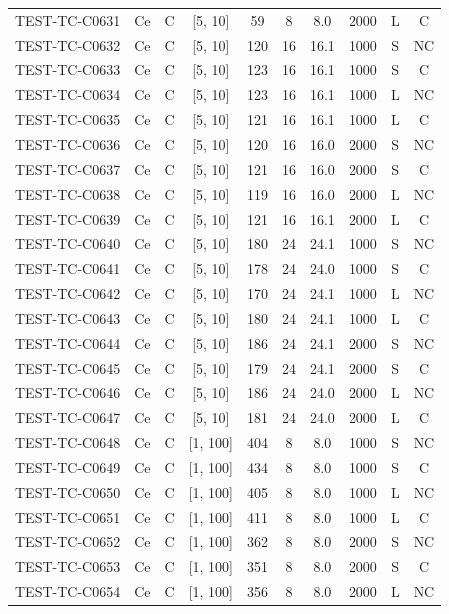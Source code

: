 \begin{longtable}{lccccccccc}
TEST-TC-C0631 & Ce & C & [5, 10] & 59 & 8 & 8.0 & 2000 & L & C \\
TEST-TC-C0632 & Ce & C & [5, 10] & 120 & 16 & 16.1 & 1000 & S & NC \\
TEST-TC-C0633 & Ce & C & [5, 10] & 123 & 16 & 16.1 & 1000 & S & C \\
TEST-TC-C0634 & Ce & C & [5, 10] & 123 & 16 & 16.1 & 1000 & L & NC \\
TEST-TC-C0635 & Ce & C & [5, 10] & 121 & 16 & 16.1 & 1000 & L & C \\
TEST-TC-C0636 & Ce & C & [5, 10] & 120 & 16 & 16.0 & 2000 & S & NC \\
TEST-TC-C0637 & Ce & C & [5, 10] & 121 & 16 & 16.0 & 2000 & S & C \\
TEST-TC-C0638 & Ce & C & [5, 10] & 119 & 16 & 16.0 & 2000 & L & NC \\
TEST-TC-C0639 & Ce & C & [5, 10] & 121 & 16 & 16.1 & 2000 & L & C \\
TEST-TC-C0640 & Ce & C & [5, 10] & 180 & 24 & 24.1 & 1000 & S & NC \\
TEST-TC-C0641 & Ce & C & [5, 10] & 178 & 24 & 24.0 & 1000 & S & C \\
TEST-TC-C0642 & Ce & C & [5, 10] & 170 & 24 & 24.1 & 1000 & L & NC \\
TEST-TC-C0643 & Ce & C & [5, 10] & 180 & 24 & 24.1 & 1000 & L & C \\
TEST-TC-C0644 & Ce & C & [5, 10] & 186 & 24 & 24.1 & 2000 & S & NC \\
TEST-TC-C0645 & Ce & C & [5, 10] & 179 & 24 & 24.1 & 2000 & S & C \\
TEST-TC-C0646 & Ce & C & [5, 10] & 186 & 24 & 24.0 & 2000 & L & NC \\
TEST-TC-C0647 & Ce & C & [5, 10] & 181 & 24 & 24.0 & 2000 & L & C \\
TEST-TC-C0648 & Ce & C & [1, 100] & 404 & 8 & 8.0 & 1000 & S & NC \\
TEST-TC-C0649 & Ce & C & [1, 100] & 434 & 8 & 8.0 & 1000 & S & C \\
TEST-TC-C0650 & Ce & C & [1, 100] & 405 & 8 & 8.0 & 1000 & L & NC \\
TEST-TC-C0651 & Ce & C & [1, 100] & 411 & 8 & 8.0 & 1000 & L & C \\
TEST-TC-C0652 & Ce & C & [1, 100] & 362 & 8 & 8.0 & 2000 & S & NC \\
TEST-TC-C0653 & Ce & C & [1, 100] & 351 & 8 & 8.0 & 2000 & S & C \\
TEST-TC-C0654 & Ce & C & [1, 100] & 356 & 8 & 8.0 & 2000 & L & NC \\

\end{longtable}
